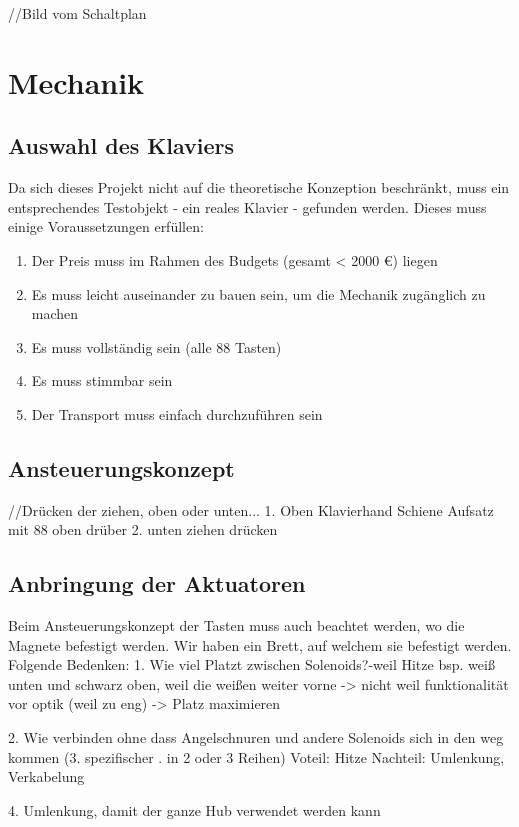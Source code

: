 //Bild vom Schaltplan

\section{Mechanik}\label{vorgehenHW}

\subsection{Auswahl des Klaviers}

Da sich dieses Projekt nicht auf die theoretische Konzeption beschränkt, muss ein entsprechendes Testobjekt - ein reales Klavier - gefunden werden.
Dieses muss einige Voraussetzungen erfüllen:
\begin{enumerate}
	\item 	Der Preis muss im Rahmen des Budgets (gesamt < 2000 €) liegen
	\item 	Es muss leicht auseinander zu bauen sein, um die Mechanik zugänglich zu machen
	\item 	Es muss vollständig sein (alle 88 Tasten)
	\item 	Es muss stimmbar sein
	\item 	Der Transport muss einfach durchzuführen sein
\end{enumerate}


\subsection{Ansteuerungskonzept}

//Drücken der ziehen, oben oder unten...
1. Oben
	Klavierhand
	Schiene
	Aufsatz mit 88 oben drüber
2. unten
	ziehen
	drücken

\subsection{Anbringung der Aktuatoren}
Beim Ansteuerungskonzept der Tasten muss auch beachtet werden, wo die Magnete befestigt werden.
Wir haben ein Brett, auf welchem sie befestigt werden. Folgende Bedenken:
1. Wie viel Platzt zwischen Solenoids?-weil Hitze
bsp. weiß unten und schwarz oben, weil die weißen weiter vorne
	-> nicht weil funktionalität vor optik (weil zu eng)
 -> Platz maximieren

2. Wie verbinden ohne dass Angelschnuren und andere Solenoids sich in den weg kommen
(3. spezifischer . in 2 oder 3 Reihen)
Voteil: Hitze
Nachteil: Umlenkung, Verkabelung

4. Umlenkung, damit der ganze Hub verwendet werden kann

